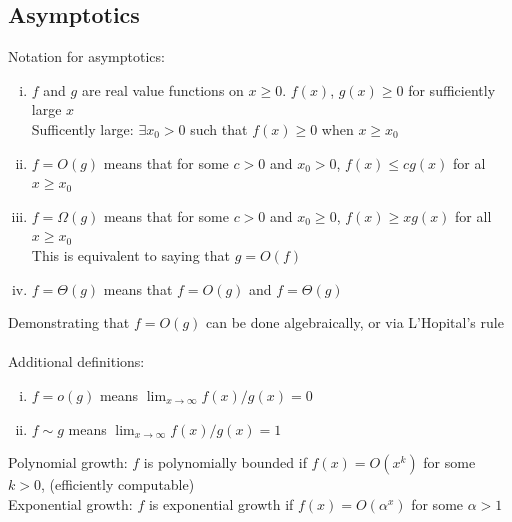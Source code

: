 \documentclass{article}
\begin{document}
		\subsection{Asymptotics}
			Notation for asymptotics:
			\begin{enumerate}[(i)]
				\item $f$ and $g$ are real value functions on $x \geq 0$. $f(x)$, $g(x) \geq 0$ for sufficiently large $x$ \\
				Sufficently large: $\exists x_0 > 0$ such that $f(x) \geq 0$ when $x \geq x_0$
				\item $f = O(g)$ means that for some $c > 0$ and $x_0 > 0$, $f(x) \leq cg(x)$ for al $x \geq x_0$
				\item $f = \Omega(g)$ means that for some $c > 0$ and $x_0 \geq 0$, $f(x) \geq xg(x)$ for all $x \geq x_0$ \\
				This is equivalent to saying that $g = O(f)$
				\item $f = \Theta(g)$ means that $f = O(g)$ and $f = \Theta(g)$
				\end{enumerate}
			Demonstrating that $f = O(g)$ can be done algebraically, or via L'Hopital's rule \\
			\\
			Additional definitions:
			\begin{enumerate}[(i)]
				\item $f = o(g)$ means $\lim_{x \to \infty} f(x)/g(x) = 0$
				\item $f \sim g$ means $\lim_{x \to \infty} f(x)/g(x) = 1$
				\end{enumerate}
			Polynomial growth: $f$ is polynomially bounded if $f(x) = O(x^k)$ for some $k > 0$, (efficiently computable) \\
			Exponential growth: $f$ is exponential growth if $f(x) = O(\alpha^x)$ for some $\alpha > 1$
\end{document}

